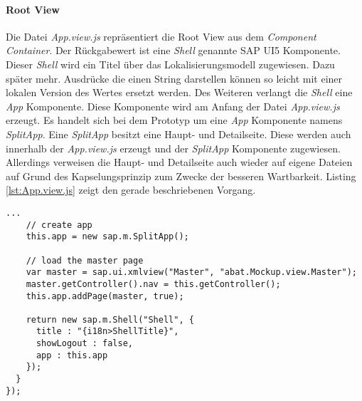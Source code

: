 \paragraph{Root View}$\;$ \\
Die Datei \textit{App.view.js} repräsentiert die Root View aus dem \textit{Component Container}. Der Rückgabewert ist eine \textit{Shell} genannte SAP UI5 Komponente. Dieser \textit{Shell} wird ein Titel über das Lokalisierungsmodell zugewiesen. Dazu später mehr. Ausdrücke die einen String darstellen können so leicht mit einer lokalen Version des Wertes ersetzt werden. Des Weiteren verlangt die \textit{Shell} eine \textit{App} Komponente. Diese Komponente wird am Anfang der Datei \textit{App.view.js} erzeugt. Es handelt sich bei dem Prototyp um eine \textit{App} Komponente namens \textit{SplitApp}. Eine \textit{SplitApp} besitzt eine Haupt- und Detailseite. Diese werden auch innerhalb der \textit{App.view.js} erzeugt und der \textit{SplitApp} Komponente zugewiesen. Allerdings verweisen die Haupt- und Detailseite auch wieder auf eigene Dateien auf Grund des Kapselungsprinzip zum Zwecke der besseren Wartbarkeit. Listing \ref{lst:App.view.js} zeigt den gerade beschriebenen Vorgang.

	\begin{lstlisting}[frame=htrbl, caption=Root View der Applikation, label=lst:App.view.js]
...
    // create app
    this.app = new sap.m.SplitApp();

    // load the master page
    var master = sap.ui.xmlview("Master", "abat.Mockup.view.Master");
    master.getController().nav = this.getController();
    this.app.addPage(master, true);

    return new sap.m.Shell("Shell", {
      title : "{i18n>ShellTitle}",
      showLogout : false,
      app : this.app
    });
  }
});
	\end{lstlisting}
	
